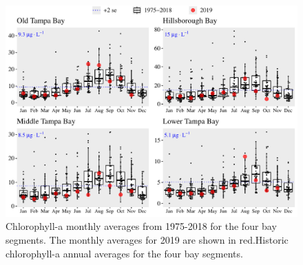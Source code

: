 \documentclass[final,t]{beamer}\usepackage[]{graphicx}\usepackage[]{color}
\begin{document}
\begin{frame}
\begin{columns}[t]
\begin{column}{.79\linewidth}
\begin{figure}
\centerline{\includegraphics[trim = 0cm 0cm 0cm 0cm, width=1\linewidth]{figure/chlboxplot.pdf}}
\caption{\footnotesize Chlorophyll-a monthly averages from 1975-2018 for the four bay segments. The monthly averages for 2019 are shown in red.Historic chlorophyll-a annual averages for the four bay segments.}
\label{fig:chlboxplot}
\end{figure}

\vspace{-0.4in}


\end{column}
\end{columns}
\end{frame}
\end{document}
